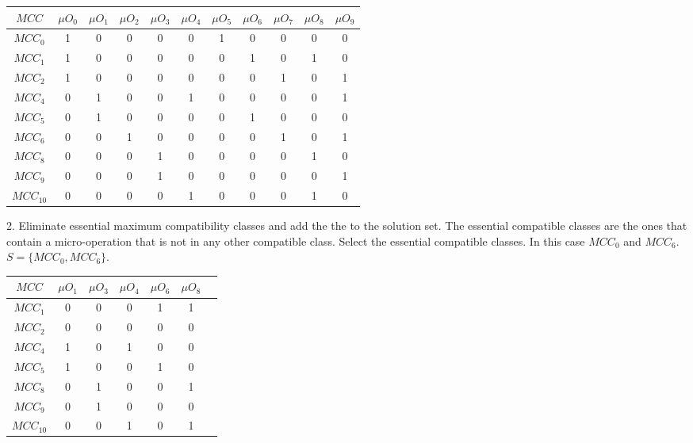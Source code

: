     \begin{table}[H]
        \centering
            \begin{tabular}{|c|c|c|c|c|c|c|c|c|c|c|}
                \hline
                $MCC$ & $\mu O_{0}$ & $\mu O_{1}$ & $\mu O_{2}$ & $\mu O_{3}$ & $\mu O_{4}$ & $\mu O_{5}$ & $\mu O_{6}$ & $\mu O_{7}$ & $\mu O_{8}$ & $\mu O_{9}$ \\ \hline
                $MCC_{0}$ & 1 & 0 & 0 & 0 & 0 & 1 & 0 & 0 & 0 & 0 \\ \hline
                $MCC_{1}$ & 1 & 0 & 0 & 0 & 0 & 0 & 1 & 0 & 1 & 0 \\ \hline
                $MCC_{2}$ & 1 & 0 & 0 & 0 & 0 & 0 & 0 & 1 & 0 & 1 \\ \hline
                $MCC_{4}$ & 0 & 1 & 0 & 0 & 1 & 0 & 0 & 0 & 0 & 1 \\ \hline
                $MCC_{5}$ & 0 & 1 & 0 & 0 & 0 & 0 & 1 & 0 & 0 & 0 \\ \hline
                $MCC_{6}$ & 0 & 0 & 1 & 0 & 0 & 0 & 0 & 1 & 0 & 1 \\ \hline
                $MCC_{8}$ & 0 & 0 & 0 & 1 & 0 & 0 & 0 & 0 & 1 & 0 \\ \hline
                $MCC_{9}$ & 0 & 0 & 0 & 1 & 0 & 0 & 0 & 0 & 0 & 1 \\ \hline
                $MCC_{10}$ & 0 & 0 & 0 & 0 & 1 & 0 & 0 & 0 & 1 & 0 \\ \hline
            \end{tabular}
    \end{table}

2. Eliminate essential maximum compatibility classes and add the the to the solution set.
The essential compatible classes are the ones that contain a micro-operation that is not in any other compatible class.
Select the essential compatible classes. In this case $MCC_{0}$ and $MCC_{6}$.
$S = \{MCC_{0}, MCC_{6}\}$.

\begin{table}[H]
    \centering
        \begin{tabular}{|c|c|c|c|c|c|c|}
            \hline
            $MCC$ & $\mu O_{1}$ & $\mu O_{3}$ & $\mu O_{4}$ & $\mu O_{6}$ & $\mu O_{8}$ \\ \hline
            $MCC_{1}$ & 0 & 0 & 0 & 1 & 1 \\ \hline
            $MCC_{2}$ & 0 & 0 & 0 & 0 & 0 \\ \hline
            $MCC_{4}$ & 1 & 0 & 1 & 0 & 0 \\ \hline
            $MCC_{5}$ & 1 & 0 & 0 & 1 & 0 \\ \hline
            $MCC_{8}$ & 0 & 1 & 0 & 0 & 1 \\ \hline
            $MCC_{9}$ & 0 & 1 & 0 & 0 & 0 \\ \hline
            $MCC_{10}$ & 0 & 0 & 1 & 0 & 1 \\ \hline
        \end{tabular}
\end{table}

